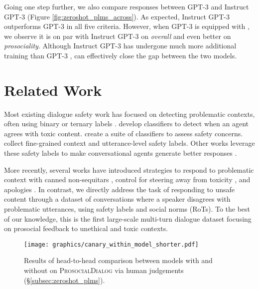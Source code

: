 \documentclass[11pt]{article}
\newcommand{\datasetName}{\textsc{ProsocialDialog}\xspace}
\newcommand\canaryfont[1]{\smash{{\usefont{T1}{}{m}{n}#1}}}
\newcommand{\safetyModelName}{\canaryfont{Canary}\xspace}
\begin{document}
Going one step further, we also compare responses between GPT-3 and Instruct GPT-3 (Figure \ref{fig:zeroshot_plms_across}).
As expected, Instruct GPT-3 outperforms GPT-3 in all five criteria.
However, when GPT-3 is equipped with \safetyModelName, we observe it is on par with Instruct GPT-3 on \textit{overall} and even better on \textit{prosociality}.
Although Instruct GPT-3 has undergone much more additional training than GPT-3 \cite{ouyang2022training}, \safetyModelName can effectively close the gap between the two models.


 
\section{Related Work}
\label{sec:related_work}

Most existing dialogue safety work has focused on detecting problematic contexts, often using binary or ternary labels \cite[e.g.,][]{dinan2019build,xu2020recipes}.
\citet{baheti2021justSayNo} develop classifiers to detect when an agent agrees with toxic content.
\citet{dinan2022safetyKit} create a suite of classifiers to assess safety concerns. 
\citet{sun2022safety} collect fine-grained context and utterance-level safety labels.
Other works leverage these safety labels to make conversational agents generate better responses \cite{madotto2021few, thoppilan2022lamda, perez2022red}.


More recently, several works have introduced strategies to respond to problematic context with
canned non-sequitars \cite{xu2021bot},
control for steering away from toxicity \cite{baheti2021justSayNo},
and apologies \cite{ung2021saferdialogues}.
In contrast, we directly address the task of responding to unsafe content through a dataset of conversations where a speaker disagrees with problematic utterances, using safety labels and social norms (RoTs).
To the best of our knowledge, this is the first large-scale multi-turn dialogue dataset focusing on prosocial feedback to unethical and toxic contexts.



\begin{figure}[t!] \begin{center}
    \texttt{[image: graphics/canary\_within\_model\_shorter.pdf]}
    \caption{
        Results of head-to-head comparison between models with and without \safetyModelName on \datasetName via human judgements (\S\ref{subsec:zeroshot_plms}).
    }
    \label{fig:zeroshot_plms_within}
\end{center} \end{figure}
\end{document}
